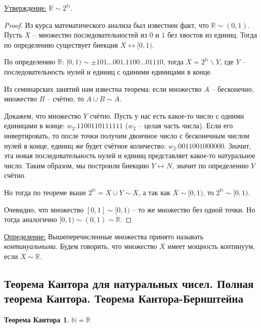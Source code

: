 \documentclass[a4paper, 12pt]{article}
\newtheorem*{cantor}{Теорема Кантора}
\newcommand{\definition}{\underline{Определение:} }
\newcommand{\statement}{\underline{Утверждение:} }
\newcommand{\N}{\mathbb{N}}
\newcommand{\R}{\mathbb{R}}
\begin{document}
\statement $\R \sim 2^{\N}$.
\begin{proof}
    
    Из курса математического анализа был известнен факт, что $\R \sim (0, 1)$. Пусть $X$ -- множество последовательностей из $0$ и $1$ без хвостов из единиц. Тогда по определению существует биекция $X \leftrightarrow [0, 1)$.
    
    По определению $\R$: $[0, 1) \sim \pm 101 \ldots 001.1100 \ldots 01110$, тогда $X = 2^{\N} \backslash Y$, где $Y$ -- последовательность нулей и единиц с одиними единицами в конце.
    
    Из семинарских занятий нам известна теорема: если множество $A$ -- бесконечно, множество $B$ -- счётно, то $A \cup B \sim A$.
    
    Докажем, что множество $Y$ счётно. Пусть у нас есть какое-то число с одними единицами в конце: $w_{2}.1100110111111$ ($w_{2}$ -- целая часть числа). Если его инвертировать, то после точки получим двоичное число с бесконечным числом нулей в конце, единиц же будет счётное количество: $w_{2}.0011001000000$. Значит, эта новая последовательность нулей и единиц представляет какое-то натуральное число. Таким образом, мы построили биекцию $Y \leftrightarrow N$, значит по определению $Y$ счётно.
    
    Но тогда по теореме выше $2^{\N} = X \cup Y \sim X$, а так как $X \sim [0, 1)$, то $2^{\N} \sim [0, 1)$. 
    
    Очевидно, что множество $[0, 1] \sim [0, 1)$ -- то же множество без одной точки. Но тогда аналогично $[0, 1) \sim (0, 1) \sim \R$.
    
\end{proof}

\definition Вышеперечисленные множества принято называть \textit{континуальными}. Будем говорить, что множество $X$ имеет мощность континуум, если $X \sim \R$.

\subsection*{Теорема Кантора для натуральных чисел. Полная теорема Кантора. Теорема Кантора-Бернштейна}
    
\begin{cantor}
    $\N \nsim \R$
\end{cantor}
\end{document}
